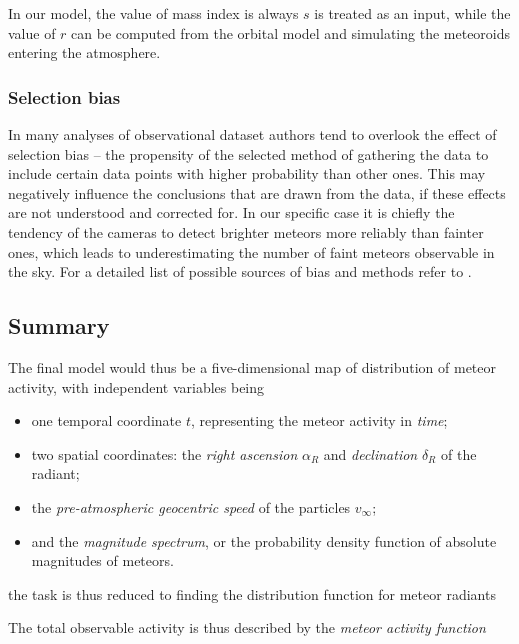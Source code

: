             In our model, the value of mass index is always $s$ is treated as an input,
            while the value of $r$ can be computed from the orbital model and simulating the meteoroids entering the atmosphere.

        \subsubsection{Selection bias} \label{msab}
            In many analyses of observational dataset authors tend to overlook the effect of selection bias --  the
            propensity of the selected method of gathering the data to include certain data points with higher probability than other ones.
            This may negatively influence the conclusions that are drawn from the data, if these effects are not understood and corrected for.
            In our specific case it is chiefly the tendency of the cameras to detect brighter meteors more reliably than fainter ones,
            which leads to underestimating the number of faint meteors observable in the sky.
            For a detailed list of possible sources of bias and methods refer to \citep{balaz-thesis}.

    \subsection{Summary} \label{msm}
        The final model would thus be a five-dimensional map of distribution of meteor activity, with independent variables being
        \begin{itemize}
            \item one temporal coordinate $t$, representing the meteor activity in \emph{time};
            \item two spatial coordinates: the \emph{right ascension} $\alpha_R$ and \emph{declination} $\delta_R$ of the radiant;
            \item the \emph{pre-atmospheric geocentric speed} of the particles $v_\infty$;
            \item and the \emph{magnitude spectrum}, or the probability density function of absolute magnitudes of meteors.
        \end{itemize}

        the task is thus reduced to finding the distribution function for meteor radiants


        The total observable activity is thus described by the \emph{meteor activity function}


